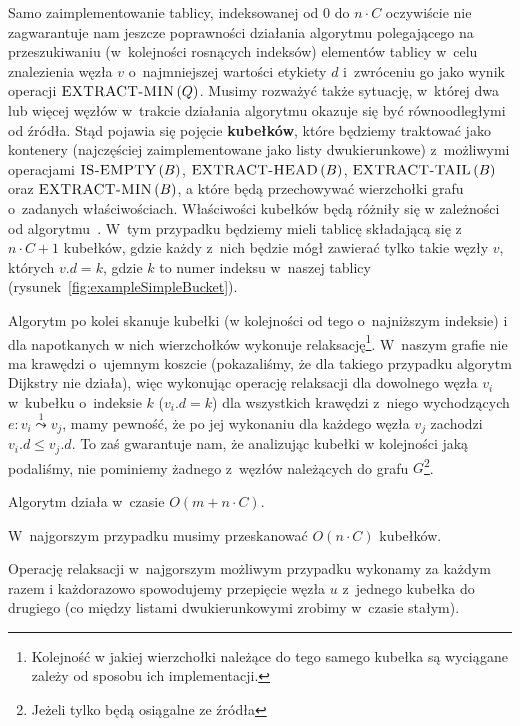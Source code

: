 Samo zaimplementowanie tablicy, indeksowanej od $0$ do $n \cdot C$ oczywiście nie zagwarantuje nam jeszcze poprawności działania algorytmu polegającego na przeszukiwaniu (w~kolejności rosnących indeksów) elementów tablicy w~celu znalezienia węzła $v$ o~najmniejszej wartości etykiety $d$ i~zwróceniu go jako wynik operacji $\textrm{\textsc{EXTRACT-MIN}} \left( Q \right)$.
Musimy rozważyć także sytuację, w~której dwa lub więcej węzłów w~trakcie działania algorytmu okazuje się być równoodległymi od źródła.
Stąd pojawia się pojęcie \textbf{kubełków}, które będziemy traktować jako kontenery (najczęściej zaimplementowane jako listy dwukierunkowe) z~możliwymi operacjami $\textrm{\textsc{IS-EMPTY}} \left( B \right)$, $\textrm{\textsc{EXTRACT-HEAD}} \left( B \right)$, $\textrm{\textsc{EXTRACT-TAIL}} \left( B \right)$ oraz $\textrm{\textsc{EXTRACT-MIN}} \left( B \right)$, a które będą przechowywać wierzchołki grafu o~zadanych właściwościach.
Właściwości kubełków będą różniły się w zależności od algorytmu~\cite[$79$--$81$]{GIDA}.
W~tym przypadku będziemy mieli tablicę składającą się z~$n \cdot C + 1$ kubełków, gdzie każdy z~nich będzie mógł zawierać tylko takie węzły $v$, których $v.d = k$, gdzie $k$ to numer indeksu w~naszej tablicy (rysunek~\ref{fig:exampleSimpleBucket}). 

Algorytm po kolei skanuje kubełki (w kolejności od tego o~najniższym indeksie) i dla napotkanych w nich wierzchołków wykonuje relaksację\footnote{
	Kolejność w jakiej wierzchołki należące do tego samego kubełka są wyciągane zależy od sposobu ich implementacji.
}.
W~naszym grafie nie ma krawędzi o~ujemnym koszcie (pokazaliśmy, że dla takiego przypadku algorytm Dijkstry nie działa), więc wykonując operację relaksacji dla dowolnego węzła $v_{i}$ w~kubełku o~indeksie $k$ ($v_{i}.d = k$) dla wszystkich krawędzi z~niego wychodzących $e : v_{i} \overset{1}\leadsto v_{j}$, mamy pewność, że po jej wykonaniu dla każdego węzła $v_{j}$ zachodzi $v_{i}.d \leqslant v_{j}.d$.
To zaś gwarantuje nam, że analizując kubełki w kolejności jaką podaliśmy, nie pominiemy żadnego z~węzłów należących do grafu $G$\footnote{Jeżeli tylko będą osiągalne ze źródła}.

Algorytm działa w~czasie $O \left( m + n \cdot C \right)$.

\begin{myitemize}
	\item W~najgorszym przypadku musimy przeskanować $O \left( n \cdot C \right)$ kubełków.
	\item Operację relaksacji w~najgorszym możliwym przypadku wykonamy za każdym razem i każdorazowo spowodujemy przepięcie węzła $u$ z~jednego kubełka do drugiego (co między listami dwukierunkowymi zrobimy w~czasie stałym).
\end{myitemize}



